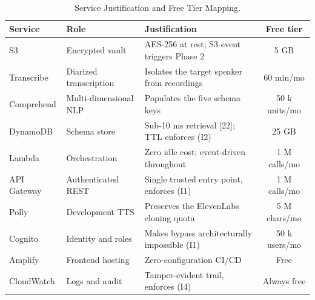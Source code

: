 \begin{table}[htbp]
\caption{Service Justification and Free Tier Mapping.}
\label{tab:service_justification}
\centering
\begin{tabular}{lllc}
\toprule
\textbf{Service} & \textbf{Role} & \textbf{Justification} & \textbf{Free tier} \\
\midrule
S3          & Encrypted vault           & AES-256 at rest; S3 event triggers Phase 2        & 5 GB \\
Transcribe  & Diarized transcription    & Isolates the target speaker from recordings       & 60 min/mo \\
Comprehend  & Multi-dimensional NLP     & Populates the five schema keys                     & 50 k units/mo \\
DynamoDB    & Schema store              & Sub-10 ms retrieval [22]; TTL enforces (I2)        & 25 GB \\
Lambda      & Orchestration             & Zero idle cost; event-driven throughout            & 1 M calls/mo \\
API Gateway & Authenticated REST        & Single trusted entry point, enforces (I1)          & 1 M calls/mo \\
Polly       & Development TTS           & Preserves the ElevenLabs cloning quota             & 5 M chars/mo \\
Cognito     & Identity and roles        & Makes bypass architecturally impossible (I1)      & 50 k users/mo \\
Amplify     & Frontend hosting          & Zero-configuration CI/CD                           & Free \\
CloudWatch  & Logs and audit            & Tamper-evident trail, enforces (I4)                & Always free \\
\bottomrule
\end{tabular}
\end{table}

